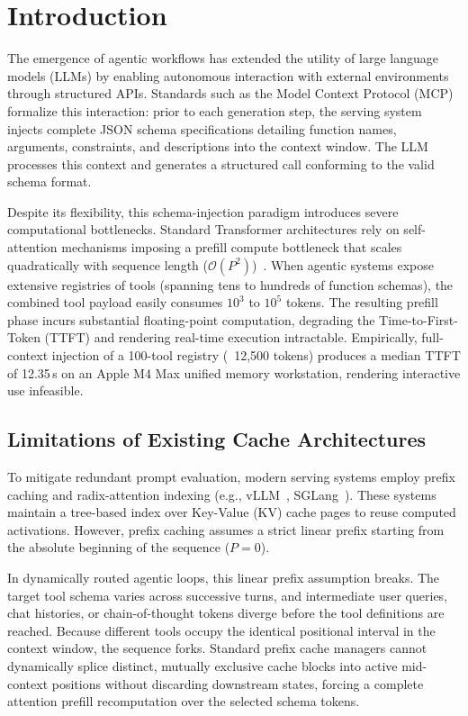 \section{Introduction}
\label{sec:introduction}

The emergence of agentic workflows has extended the utility of large language models (LLMs) by enabling autonomous interaction with external environments through structured APIs. Standards such as the Model Context Protocol (MCP)~\cite{anthropic2024mcp} formalize this interaction: prior to each generation step, the serving system injects complete JSON schema specifications detailing function names, arguments, constraints, and descriptions into the context window. The LLM processes this context and generates a structured call conforming to the valid schema format.

Despite its flexibility, this schema-injection paradigm introduces severe computational bottlenecks. Standard Transformer architectures rely on self-attention mechanisms imposing a prefill compute bottleneck that scales quadratically with sequence length ($\mathcal{O}(P^2)$)~\cite{vaswani2017attention}. When agentic systems expose extensive registries of tools (spanning tens to hundreds of function schemas), the combined tool payload easily consumes $10^3$ to $10^5$ tokens. The resulting prefill phase incurs substantial floating-point computation, degrading the Time-to-First-Token (TTFT) and rendering real-time execution intractable. Empirically, full-context injection of a 100-tool registry (~12,500 tokens) produces a median TTFT of 12.35\,s on an Apple M4 Max unified memory workstation, rendering interactive use infeasible.

\subsection{Limitations of Existing Cache Architectures}
To mitigate redundant prompt evaluation, modern serving systems employ prefix caching and radix-attention indexing (e.g., vLLM~\cite{kwon2023vllm}, SGLang~\cite{zheng2024sglang}). These systems maintain a tree-based index over Key-Value (KV) cache pages to reuse computed activations. However, prefix caching assumes a strict linear prefix starting from the absolute beginning of the sequence ($P=0$). 

In dynamically routed agentic loops, this linear prefix assumption breaks. The target tool schema varies across successive turns, and intermediate user queries, chat histories, or chain-of-thought tokens diverge before the tool definitions are reached. Because different tools occupy the identical positional interval in the context window, the sequence forks. Standard prefix cache managers cannot dynamically splice distinct, mutually exclusive cache blocks into active mid-context positions without discarding downstream states, forcing a complete attention prefill recomputation over the selected schema tokens.

